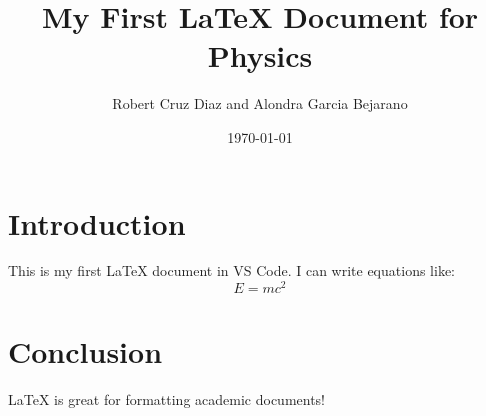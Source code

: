 \documentclass{article}
\begin{document}
\title{My First LaTeX Document for Physics}
\author{Robert Cruz Diaz and Alondra Garcia Bejarano}
\date{\today}

\maketitle

\section{Introduction}
This is my first LaTeX document in VS Code. I can write equations like:
\[
    E = mc^2
\]

\section{Conclusion}
LaTeX is great for formatting academic documents!
\end{document}
